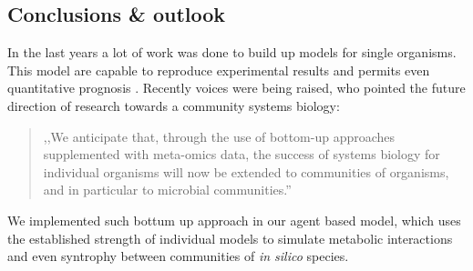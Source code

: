 \subsection{Conclusions \& outlook}
In the last years a lot of work was done to build up models for single organisms.
This model are capable to reproduce experimental results and permits even quantitative prognosis \cite{mccloskey}.
Recently voices were being raised, who pointed the future direction of research towards a community systems biology:
\begin{quote}
,,We anticipate that, through the use of bottom-up approaches supplemented with meta-omics data, the success of systems biology for individual organisms will now be extended to communities of organisms, and in particular to microbial communities.'' \cite{cosys}
\end{quote}
We implemented such bottum up approach in our agent based model, which uses the established strength of individual models to simulate metabolic interactions and even syntrophy between communities of \textit{in silico} species.
